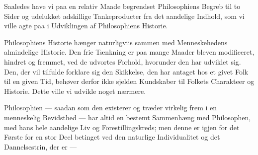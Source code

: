 \documentclass[12pt]{article}
\begin{document}
Saaledes have vi paa en relativ Maade begrendset Philosophiens
Begreb til to Sider og udelukket adskillige Tankeproducter
fra det aandelige Indhold, som vi ville agte paa i Udviklingen
af Philosophiens Historie.

Philosophiens Historie hænger naturligviis sammen med
Menneskehedens almindelige Historie. Den frie Tænkning er
paa mange Maader bleven modificeret, hindret og fremmet, ved
de udvortes Forhold, hvorunder den har udviklet sig. Den, der
vil tilfulde forklare sig den Skikkelse, den har antaget hos
et givet Folk til en given Tid, behøver derfor ikke sjelden
Kundskaber til Folkets Charakteer og Historie. Dette ville
vi udvikle noget nærmere.

Philosophien --- saadan som den existerer og træder virkelig
frem i en menneskelig Bevidsthed --- har altid en bestemt
Sammenhæng med Philosophen, med hans hele aandelige Liv og
Forestillingskreds; men denne er igjen for det Første for en
stor Deel betinget ved den naturlige Individualitet og det
Dannelsestrin, der er ---





\end{document}

